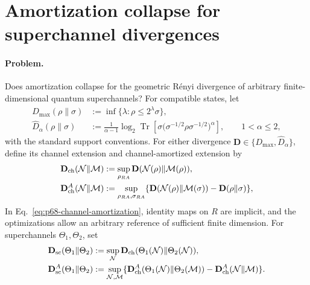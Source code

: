 \section{Amortization collapse for superchannel divergences}
\label{sec:op_1482756b02794495}

\paragraph{Problem.}
Does amortization collapse for the geometric R\'enyi divergence of
arbitrary finite-dimensional quantum superchannels?
For compatible states, let
\begin{equation}
  \begin{aligned}
  D_{\max}(\rho\|\sigma)
    &:=\inf\{\lambda:\rho\leq2^\lambda\sigma\},\\
  \widehat D_\alpha(\rho\|\sigma)
    &:=\frac1{\alpha-1}\log_2\operatorname{Tr}\!\left[
      \sigma\bigl(\sigma^{-1/2}\rho\sigma^{-1/2}\bigr)^\alpha
      \right],\qquad 1<\alpha\leq2,
  \end{aligned}
  \label{eq:p68-state-divergences}
\end{equation}
with the standard support conventions.  For either divergence
$\mathbf D\in\{D_{\max},\widehat D_\alpha\}$, define its channel extension
and channel-amortized extension by
\begin{equation}
  \begin{aligned}
  \mathbf D_{\rm ch}(\mathcal N\|\mathcal M)
    &:=\sup_{\rho_{RA}}
       \mathbf D(\mathcal N(\rho)\|\mathcal M(\rho)),\\
  \mathbf D_{\rm ch}^{A}(\mathcal N\|\mathcal M)
    &:=\sup_{\rho_{RA},\sigma_{RA}}
       \{\mathbf D(\mathcal N(\rho)\|\mathcal M(\sigma))
         -\mathbf D(\rho\|\sigma)\},
  \end{aligned}
  \label{eq:p68-channel-amortization}
\end{equation}
In Eq.~\eqref{eq:p68-channel-amortization}, identity maps on $R$ are implicit,
and the optimizations allow an arbitrary reference of sufficient finite
dimension.  For superchannels
$\Theta_1,\Theta_2$, set
\begin{equation}
  \begin{aligned}
  \mathbf D_{\rm sc}(\Theta_1\|\Theta_2)
    &:=\sup_{\mathcal N}
      \mathbf D_{\rm ch}(\Theta_1(\mathcal N)\|\Theta_2(\mathcal N)),\\
  \mathbf D_{\rm sc}^{A}(\Theta_1\|\Theta_2)
    &:=\sup_{\mathcal N,\mathcal M}
      \{\mathbf D_{\rm ch}^{A}
          (\Theta_1(\mathcal N)\|\Theta_2(\mathcal M))
        -\mathbf D_{\rm ch}^{A}(\mathcal N\|\mathcal M)\}.
  \end{aligned}
  \label{eq:p68-superchannel-amortization}
\end{equation}
